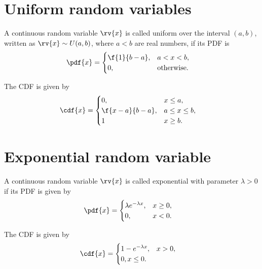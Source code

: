\section{Uniform random variables}
\begin{mydefinition}
    A continuous random variable $\rv{x}$ is called uniform over the interval $(a,b)$, written as $\rv{x}\sim U(a,b)$, where $a<b$ are real numbers, if its PDF is
    \begin{align}
        \pdf{x} &= 
        \begin{cases}
            \f{1}{b-a}, & a < x < b,\\
            0, &\text{otherwise}.
        \end{cases}
    \end{align}
\end{mydefinition}

\begin{mytheorem}
     The CDF is given by
     \begin{align}
         \cdf{x} &=
         \begin{cases}
             0, & x \leq a,\\
             \f{x-a}{b-a}, & a\leq x\leq b,\\
             1& x \geq b.
         \end{cases}
     \end{align}
\end{mytheorem}

\section{Exponential random variable}
\begin{mydefinition}
    A continuous random variable $\rv{x}$ is called exponential with parameter $\lambda > 0$ if its PDF is given by
    \begin{align}
        \pdf{x} &= 
        \begin{cases}
            \lambda e^{-\lambda x}, &x\geq 0,\\
            0, &x<0.
        \end{cases}
    \end{align}
\end{mydefinition}
\begin{mytheorem}
   The CDF is given by
   \begin{align}
       \cdf{x} &= 
       \begin{cases}
           1 - e^{-\lambda x}, & x > 0,\\
           0, x \leq 0.
       \end{cases}
   \end{align}  
\end{mytheorem}


